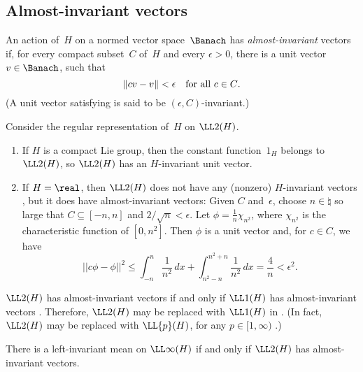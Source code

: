 \subsection{Almost-invariant vectors}

\begin{defn} \label{AlmInvtVecDefn}
 An action of~$H$ on a normed vector space~$\Banach$ has \emph{almost-invariant} vectors if, for every
compact subset~$C$ of~$H$ and every $\epsilon > 0$, there
is a unit vector
 $v \in \Banach$, such that 
 \begin{equation} \label{epsCInvt}
 \|c v - v \| < \epsilon \text{\quad for all $c \in C$}
.\end{equation}
(A unit vector satisfying  is said to be $(\epsilon,C)$-invariant.)
 \end{defn}

\begin{eg}
Consider the regular
representation of~$H$ on $\LL2(H)$.
\begin{enumerate}
\item  If $H$ is a compact Lie group, then the constant
function~$1_H$ belongs to $\LL2(H)$, so $\LL2(H)$
has an $H$-invariant unit vector.

\item If $H = \real$, then $\LL2(H)$ does not have any (nonzero)
$H$-invariant vectors , but it does have almost-invariant vectors: Given $C$ and~$\epsilon$, choose $n \in
\natural$ so large that $C \subseteq [-n,n]$ and $2/\sqrt{n}
< \epsilon$. Let $\phi = \frac{1}{n} \chi_{n^2}$, where
$\chi_{n^2}$ is the characteristic function of $[0,n^2]$.
 Then $\phi$ is a unit vector and, for $c \in C$, we
have 
  $$ ||c \phi - \phi ||^2 \le \int_{-n}^n \frac{1}{n^2}
\, dx
 + \int_{n^2-n}^{n^2 + n} \frac{1}{n^2} \, dx
 = \frac{4}{n} 
 < \epsilon^2.$$
 \end{enumerate}
 \end{eg}
 
 \begin{rem} \label{L2invtIffL1inv}
 $\LL2(H)$ has almost-invariant vectors if and only if $\LL1(H)$ has almost-invariant vectors . Therefore,  $\LL2(H)$ may be replaced with $\LL1(H)$ in . (In fact, $\LL2(H)$ may be replaced with $\LL{p}(H)$, for any $p \in [1,\infty)$ .)
 \end{rem}

 \begin{prop}[($\ref{AmenEquiv-Mean} \Leftrightarrow \ref{AmenEquiv-Vectors}$)]
There is a left-invariant mean on $\LL\infty(H)$ if and only if $\LL2(H)$ has almost-invariant vectors.
 \end{prop}
 

